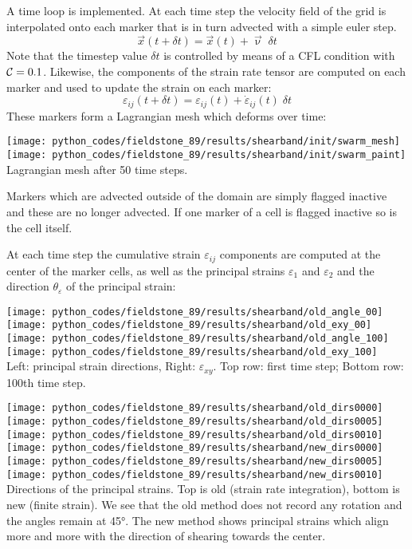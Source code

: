 A time loop is implemented. At each time step the velocity field of the grid is 
interpolated onto each marker that is in turn advected with a simple euler step. 
\[
\vec{x}(t+\delta t) = \vec{x}(t) + \vec\upnu \; \delta t
\]
Note that the timestep value $\delta t$ is controlled by means of a CFL condition 
with ${\cal C}=0.1$. Likewise, the components of the strain rate tensor are computed on each marker and 
used to update the strain on each marker:
\[
\varepsilon_{ij}(t+\delta t) = \varepsilon_{ij}(t) + \dot\varepsilon_{ij}(t) \; \delta t
\]
These markers form a Lagrangian mesh which deforms over time:
\begin{center}
\texttt{[image: python\_codes/fieldstone\_89/results/shearband/init/swarm\_mesh]}
\texttt{[image: python\_codes/fieldstone\_89/results/shearband/init/swarm\_paint]}\\
{\captionfont Lagrangian mesh after 50 time steps.}
\end{center}
Markers which are advected outside of the domain are simply flagged inactive and these
are no longer advected. If one marker of a cell is flagged inactive so is the cell itself. 

At each time step the cumulative strain $\varepsilon_{ij}$ components are
computed at the center of the marker cells, as well as the principal strains $\varepsilon_1$ 
and $\varepsilon_2$ and the direction $\theta_\varepsilon$ of the principal strain:

\begin{center}
\texttt{[image: python\_codes/fieldstone\_89/results/shearband/old\_angle\_00]}
\texttt{[image: python\_codes/fieldstone\_89/results/shearband/old\_exy\_00]}\\
\texttt{[image: python\_codes/fieldstone\_89/results/shearband/old\_angle\_100]}
\texttt{[image: python\_codes/fieldstone\_89/results/shearband/old\_exy\_100]}\\
{\captionfont Left: principal strain directions, Right: $\varepsilon_{xy}$.
Top row: first time step; Bottom row: 100th time step.}
\end{center}


\begin{center}
\texttt{[image: python\_codes/fieldstone\_89/results/shearband/old\_dirs0000]}
\texttt{[image: python\_codes/fieldstone\_89/results/shearband/old\_dirs0005]}
\texttt{[image: python\_codes/fieldstone\_89/results/shearband/old\_dirs0010]}\\
\texttt{[image: python\_codes/fieldstone\_89/results/shearband/new\_dirs0000]}
\texttt{[image: python\_codes/fieldstone\_89/results/shearband/new\_dirs0005]}
\texttt{[image: python\_codes/fieldstone\_89/results/shearband/new\_dirs0010]}\\
{\captionfont Directions of the principal strains. Top is old (strain rate integration), 
bottom is new (finite strain). We see that 
the old method does not record any rotation and the angles remain at 45\si{\degree}. 
The new method shows principal strains which align more and more with the direction 
of shearing towards the center.}
\end{center}



